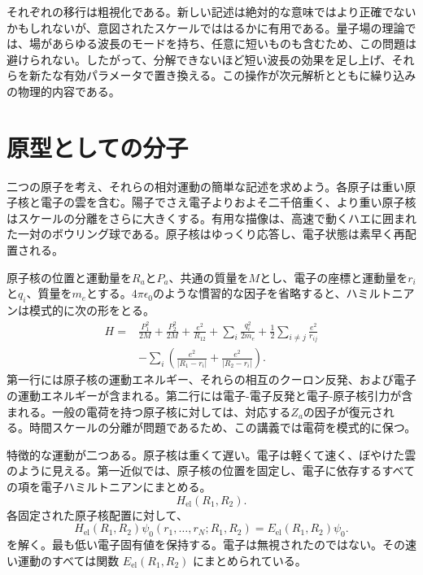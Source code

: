 それぞれの移行は粗視化である。新しい記述は絶対的な意味ではより正確でないかもしれないが、意図されたスケールでははるかに有用である。量子場の理論では、場があらゆる波長のモードを持ち、任意に短いものも含むため、この問題は避けられない。したがって、分解できないほど短い波長の効果を足し上げ、それらを新たな有効パラメータで置き換える。この操作が次元解析とともに繰り込みの物理的内容である。

\section{原型としての分子}

二つの原子を考え、それらの相対運動の簡単な記述を求めよう。各原子は重い原子核と電子の雲を含む。陽子でさえ電子よりおよそ二千倍重く、より重い原子核はスケールの分離をさらに大きくする。有用な描像は、高速で動くハエに囲まれた一対のボウリング球である。原子核はゆっくり応答し、電子状態は素早く再配置される。

原子核の位置と運動量を\(R_a\)と\(P_a\)、共通の質量を\(M\)とし、電子の座標と運動量を\(r_i\)と\(q_i\)、質量を\(m_e\)とする。\(4\pi\epsilon_0\)のような慣習的な因子を省略すると、ハミルトニアンは模式的に次の形をとる。
\begin{align}
H={}&
\frac{P_1^2}{2M}+\frac{P_2^2}{2M}
+\frac{e^2}{R_{12}}
+\sum_i\frac{q_i^2}{2m_e}
+\frac12\sum_{i\ne j}\frac{e^2}{r_{ij}}
\nonumber\\
&-\sum_i\left(
\frac{e^2}{|R_1-r_i|}
+\frac{e^2}{|R_2-r_i|}
\right).
\label{eq:molecular-hamiltonian}
\end{align}
第一行には原子核の運動エネルギー、それらの相互のクーロン反発、および電子の運動エネルギーが含まれる。第二行には電子-電子反発と電子-原子核引力が含まれる。一般の電荷を持つ原子核に対しては、対応する\(Z_a\)の因子が復元される。時間スケールの分離が問題であるため、この講義では電荷を模式的に保つ。

特徴的な運動が二つある。原子核は重くて遅い。電子は軽くて速く、ぼやけた雲のように見える。第一近似では、原子核の位置を固定し、電子に依存するすべての項を電子ハミルトニアンにまとめる。
\begin{equation}
H_{\mathrm{el}}(R_1,R_2).
\end{equation}
各固定された原子核配置に対して、
\begin{equation}
H_{\mathrm{el}}(R_1,R_2)
\psi_0(r_1,\ldots,r_N;R_1,R_2)
=
E_{\mathrm{el}}(R_1,R_2)\psi_0.
\label{eq:electronic-ground-state}
\end{equation}
を解く。最も低い電子固有値を保持する。電子は無視されたのではない。その速い運動のすべては関数
\(E_{\mathrm{el}}(R_1,R_2)\)
にまとめられている。

